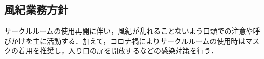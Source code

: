 \subsection*{風紀業務方針}


サークルルームの使用再開に伴い，風紀が乱れることないよう口頭での注意や呼びかけを主に活動する．加えて，コロナ禍によりサークルルームの使用時はマスクの着用を推奨し，入り口の扉を開放するなどの感染対策を行う．
